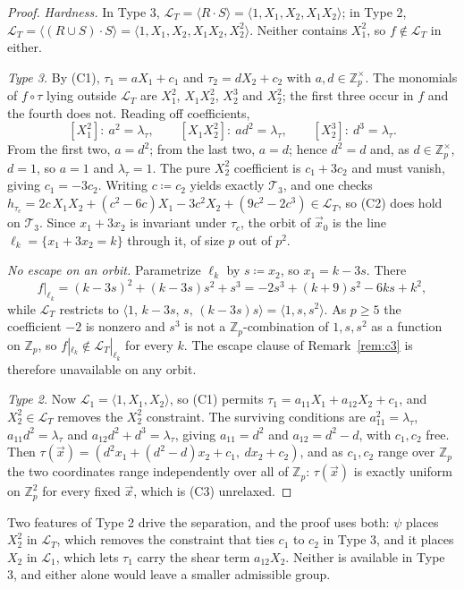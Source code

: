 \documentclass{aicr-solution}
\newcommand{\Zp}{\mathbb{Z}_p}
\newcommand{\Zpx}{\mathbb{Z}_p^{\times}}
\newcommand{\vx}{\vec{x}}
\newcommand{\LL}{\mathcal{L}}
\newcommand{\Span}[1]{\langle #1 \rangle} %
\begin{document}
\begin{proof}
\emph{Hardness.} In Type 3, $\LL_T=\Span{R\cdot S}=\Span{1,X_1,X_2,X_1X_2}$; in Type 2,
$\LL_T=\Span{(R\cup S)\cdot S}=\Span{1,X_1,X_2,X_1X_2,X_2^{2}}$. Neither contains $X_1^{2}$,
so $f\notin\LL_T$ in either.

\emph{Type 3.} By (C1), $\tau_1=aX_1+c_1$ and $\tau_2=dX_2+c_2$ with $a,d\in\Zpx$. The
monomials of $f\circ\tau$ lying outside $\LL_T$ are $X_1^{2}$, $X_1X_2^{2}$, $X_2^{3}$ and
$X_2^{2}$; the first three occur in $f$ and the fourth does not. Reading off coefficients,
\[
  [X_1^{2}]:\ a^{2}=\lambda_\tau,\qquad
  [X_1X_2^{2}]:\ ad^{2}=\lambda_\tau,\qquad
  [X_2^{3}]:\ d^{3}=\lambda_\tau.
\]
From the first two, $a=d^{2}$; from the last two, $a=d$; hence $d^{2}=d$ and, as
$d\in\Zpx$, $d=1$, so $a=1$ and $\lambda_\tau=1$. The pure $X_2^{2}$ coefficient is
$c_1+3c_2$ and must vanish, giving $c_1=-3c_2$. Writing $c\coloneqq c_2$ yields exactly
$\mathcal T_3$, and one checks $h_{\tau_c}=2c\,X_1X_2+(c^{2}-6c)X_1-3c^{2}X_2+(9c^{2}-2c^{3})
\in\LL_T$, so (C2) does hold on $\mathcal T_3$. Since $x_1+3x_2$ is invariant under $\tau_c$,
the orbit of $\vx_0$ is the line $\ell_k=\{x_1+3x_2=k\}$ through it, of size $p$ out of
$p^{2}$.

\emph{No escape on an orbit.} Parametrize $\ell_k$ by $s\coloneqq x_2$, so $x_1=k-3s$. There
\[
  f|_{\ell_k}=(k-3s)^{2}+(k-3s)s^{2}+s^{3}=-2s^{3}+(k+9)s^{2}-6ks+k^{2},
\]
while $\LL_T$ restricts to $\Span{1,\,k-3s,\,s,\,(k-3s)s}=\Span{1,s,s^{2}}$. As $p\ge 5$ the
coefficient $-2$ is nonzero and $s^{3}$ is not a $\Zp$-combination of $1,s,s^{2}$ as a
function on $\Zp$, so $f|_{\ell_k}\notin\LL_T|_{\ell_k}$ for every $k$. The escape clause of
Remark~\ref{rem:c3} is therefore unavailable on any orbit.

\emph{Type 2.} Now $\LL_1=\Span{1,X_1,X_2}$, so (C1) permits $\tau_1=a_{11}X_1+a_{12}X_2+c_1$,
and $X_2^{2}\in\LL_T$ removes the $X_2^{2}$ constraint. The surviving conditions are
$a_{11}^{2}=\lambda_\tau$, $a_{11}d^{2}=\lambda_\tau$ and $a_{12}d^{2}+d^{3}=\lambda_\tau$,
giving $a_{11}=d^{2}$ and $a_{12}=d^{2}-d$, with $c_1,c_2$ free. Then
$\tau(\vx)=(d^{2}x_1+(d^{2}-d)x_2+c_1,\ dx_2+c_2)$, and as $c_1,c_2$ range over $\Zp$ the two
coordinates range independently over all of $\Zp$: $\tau(\vx)$ is exactly uniform on $\Zp^{2}$
for every fixed $\vx$, which is (C3) unrelaxed.
\end{proof}

Two features of Type 2 drive the separation, and the proof uses both: $\psi$ places $X_2^{2}$
in $\LL_T$, which removes the constraint that ties $c_1$ to $c_2$ in Type 3, and it places
$X_2$ in $\LL_1$, which lets $\tau_1$ carry the shear term $a_{12}X_2$. Neither is available
in Type 3, and either alone would leave a smaller admissible group.
\end{document}
